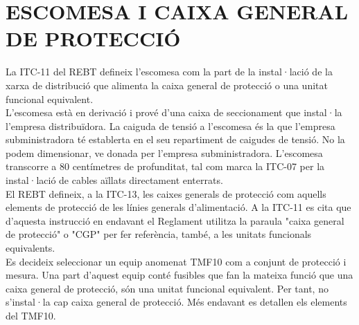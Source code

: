 \chapter{\uppercase{Escomesa i caixa general de protecció}}
La ITC-11 del REBT defineix l'escomesa com la part de la instal·lació de la xarxa de distribució que alimenta la caixa general de protecció o una unitat funcional equivalent.\\
\newline L'escomesa està en derivació i prové d'una caixa de seccionament que instal·la l'empresa distribuïdora. La caiguda de tensió a l'escomesa és la que l'empresa subministradora té establerta en el seu repartiment de caigudes de tensió. No la podem dimensionar, ve donada per l'empresa subministradora. L'escomesa transcorre a 80 centímetres de profunditat, tal com marca la ITC-07 per la instal·lació de cables aïllats directament enterrats.\\
\newline
El REBT defineix, a la ITC-13, les caixes generals de protecció com aquells elements de protecció de les línies generals d'alimentació. A la ITC-11 es cita que d'aquesta instrucció en endavant el Reglament utilitza la paraula "caixa general de protecció" o "CGP" per fer referència, també, a les unitats funcionals equivalents.\\
\newline 
Es decideix seleccionar un equip anomenat TMF10 com a conjunt de protecció i mesura. Una part d'aquest equip conté fusibles que fan la mateixa funció que una caixa general de protecció, són una unitat funcional equivalent. Per tant, no s'instal·la cap caixa general de protecció. Més endavant es detallen els elements del TMF10.


\clearpage